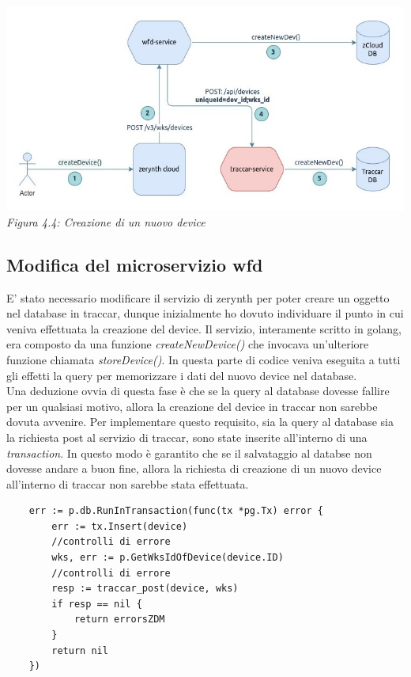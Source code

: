 \documentclass[a4paper,titlepage,12pt]{book}
\begin{document}
\begin{center}
\includegraphics[scale=0.6]{images/create_dev.jpg}\\ 
\textit{Figura 4.4: Creazione di un nuovo device}
\end{center}

\subsection{\sffamily
Modifica del microservizio wfd}
E' stato necessario modificare il servizio di zerynth per poter creare un oggetto nel database in traccar, dunque inizialmente ho dovuto individuare il punto in cui veniva effettuata la creazione del device. Il servizio, interamente scritto in golang, era composto da una funzione \textit{createNewDevice()} che invocava un'ulteriore funzione chiamata \textit{storeDevice()}. In questa parte di codice veniva eseguita a tutti gli effetti la query per memorizzare i dati del nuovo device nel database.\\
Una deduzione ovvia di questa fase è che se la query al database dovesse fallire per un qualsiasi motivo, allora la creazione del device in traccar non sarebbe dovuta avvenire. Per implementare questo requisito, sia la query al database sia la richiesta post al servizio di traccar, sono state inserite all'interno di una \textit{transaction}. In questo modo è garantito che se il salvataggio al databse non dovesse andare a buon fine, allora la richiesta di creazione di un nuovo device all'interno di traccar non sarebbe stata effettuata.\\
\begin{verbatim}
	err := p.db.RunInTransaction(func(tx *pg.Tx) error {
		err := tx.Insert(device) 
		//controlli di errore
		wks, err := p.GetWksIdOfDevice(device.ID)
		//controlli di errore
		resp := traccar_post(device, wks)
		if resp == nil {
			return errorsZDM
		}
		return nil
	})


\end{verbatim}
\end{document}
